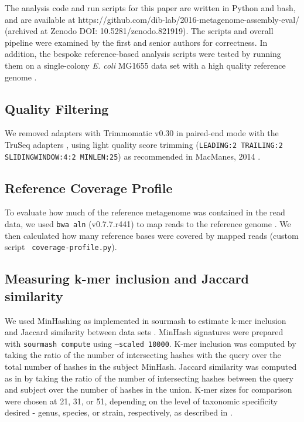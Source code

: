\documentclass[11pt]{article}
\begin{document}
The analysis code and run scripts for this paper are written in Python
and bash, and are available at
https://github.com/dib-lab/2016-metagenome-assembly-eval/ (archived at
Zenodo DOI: 10.5281/zenodo.821919). The scripts and overall
pipeline were examined by the first and senior authors for
correctness.  In addition, the bespoke reference-based analysis
scripts were tested by running them on a single-colony {\em E. coli}
MG1655 data set with a high quality reference genome
\cite{chitsaz2011}.

\subsection*{Quality Filtering} 

We removed adapters with Trimmomatic v0.30 in paired-end mode with the
TruSeq adapters \cite{trimmomatic}, using light quality score trimming
({\tt LEADING:2 TRAILING:2 SLIDINGWINDOW:4:2 MINLEN:25})
as recommended in MacManes, 2014 \cite{macmanes2014optimal}.

\subsection*{Reference Coverage Profile}

To evaluate how much of the reference metagenome was contained in the
read data, we used {\tt bwa aln} (v0.7.7.r441) to map reads to the
reference genome \cite{bwa}.  We then calculated how many reference
bases were covered by mapped reads (custom script {\tt
  coverage-profile.py}).


\subsection*{Measuring k-mer inclusion and Jaccard similarity}

We used MinHashing as implemented in sourmash to estimate k-mer
inclusion and Jaccard similarity between data sets \cite{sourmash}.
MinHash signatures were prepared with {\tt sourmash compute} using
{\tt --scaled 10000}.  K-mer inclusion was computed by taking the ratio of
the number of intersecting hashes with the query over the total number
of hashes in the subject MinHash. Jaccard similarity was computed as
in \cite{mash} by taking the ratio of the number of intersecting
hashes between the query and subject over the number of hashes in the
union.  K-mer sizes for comparison were chosen at 21, 31, or 51,
depending on the level of taxonomic specificity desired - genus,
species, or strain, respectively, as described in \cite{metapalette}.
\end{document}
